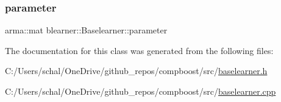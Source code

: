 \mbox{\label{classblearner_1_1_baselearner_a56e401f574b274d65e364493277f3247}} 
\subsubsection{\texorpdfstring{parameter}{parameter}}
{\footnotesize\ttfamily arma\+::mat blearner\+::\+Baselearner\+::parameter\hspace{0.3cm}{\ttfamily [protected]}}



The documentation for this class was generated from the following files\+:\begin{DoxyCompactItemize}
\item 
C\+:/\+Users/schal/\+One\+Drive/github\+\_\+repos/compboost/src/\mbox{\hyperlink{baselearner_8h}{baselearner.\+h}}\item 
C\+:/\+Users/schal/\+One\+Drive/github\+\_\+repos/compboost/src/\mbox{\hyperlink{baselearner_8cpp}{baselearner.\+cpp}}\end{DoxyCompactItemize}
